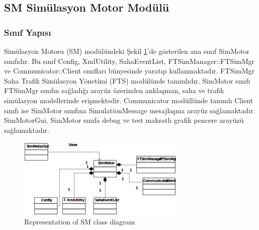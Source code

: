 \documentclass[conference]{IEEEtran}
\begin{document}
\subsection{SM Simülasyon Motor Modülü}
\subsubsection{Sınıf Yapısı}
Simülasyon Motoru (SM) modülündeki Şekil \ref{fig:smgrafic}'de gösterilen ana sınıf SimMotor sınıfıdır. Bu sınıf Config, XmlUtility, SahaEventList, FTSimManager::FTSimMgr ve Communicator::Client sınıfları bünyesinde yaratıp kullanmaktadır. FTSimMgr Saha Trafik Simülasyon Yönetimi (FTS) modülünde tanımlıdır. SimMotor sınıfı FTSimMgr sınıfın sağladığı arayüz üzerinden anklaşman, saha ve trafik simülasyon modellerinde erişmektedir. Communicator modüllünde tanımlı Client sınıfı ise SimMotor sınıfına SimulationMessage mesajlaşma arayüz sağlamaktadır. SimMotorGui, SimMotor sınıfa debug ve test maksatlı grafik pencere arayüzü sağlamaktadır.

\begin{figure}[h!]
  \centering
  \includegraphics[width=8cm]{smgrafic.jpg}
  \caption{Representation of SM class diagram}\label{fig:smgrafic}
\end{figure}
\end{document}
